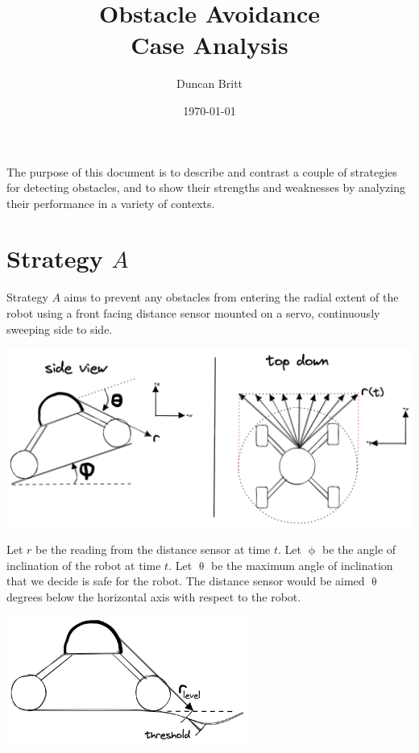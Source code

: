 \documentclass[letterpaper]{article}
\author{Duncan Britt}
\date{\today}
\title{Obstacle Avoidance\\\medskip
\large Case Analysis}
\begin{document}
\maketitle
The purpose of this document is to describe and contrast a couple of strategies for detecting obstacles, and to show their strengths and weaknesses by analyzing their performance in a variety of contexts.

\section*{Strategy \(A\)}
\label{sec:org42b97cc}
Strategy \(A\) aims to prevent any obstacles from entering the radial extent of the robot using a front facing distance sensor mounted on a servo, continuously sweeping side to side.

\begin{center}
\includegraphics[width=.9\linewidth]{./strategy-a.png}
\end{center}

Let \(r\) be the reading from the distance sensor at time \(t\).
Let \(\upphi\) be the angle of inclination of the robot at time \(t\).
Let \(\uptheta\) be the maximum angle of inclination that we decide is safe for the robot.
The distance sensor would be aimed \(\uptheta\) degrees below the horizontal axis with respect to the robot.

\begin{center}
\includegraphics[width=300px]{./strategy-a2.png}
\end{center}
\end{document}
